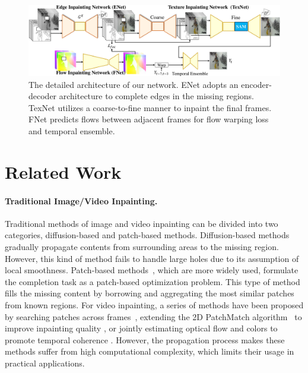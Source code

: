 \begin{figure}[ht]
	\centering
	\includegraphics[width=2.0\columnwidth]{sti} %
	\caption{The detailed architecture of our network. ENet adopts an encoder-decoder architecture to complete edges in the missing regions. TexNet utilizes a coarse-to-fine manner to inpaint the final frames. FNet predicts flows between adjacent frames for flow warping loss and temporal ensemble. }
	 
	\label{fig:stiNet}
\end{figure}


\section{Related Work}
\paragraph{Traditional Image/Video Inpainting.}
Traditional methods of image and video inpainting can be divided into two categories, diffusion-based and patch-based methods. 
Diffusion-based methods \cite{bertalmio2000image,ballester2001filling} gradually propagate contents from surrounding areas to the missing region. 
However, this kind of method fails to handle large holes due to its assumption of local smoothness. 
%
Patch-based methods~\cite{bertalmio2003simultaneous,efros2001image}, which are more widely used, formulate the completion task as a patch-based optimization problem. 
This type of method fills the missing content by borrowing and aggregating the most similar patches from known regions. 
%
For video inpainting, a series of methods have been proposed by searching patches across frames~\cite{patwardhan2007video}, extending the 2D PatchMatch algorithm~\cite{barnes2009patchmatch} to improve inpainting quality \cite{newson2014video}, or jointly estimating optical flow and colors to promote temporal coherence \cite{huang2016temporally}. 
However, the propagation process makes these methods suffer from high computational complexity, which limits their usage in practical applications. 

